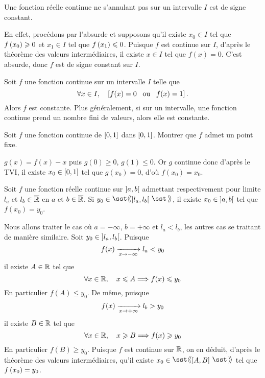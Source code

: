 \documentclass{magnolia}
\begin{document}
\begin{remarques}
\remarque Une fonction réelle continue ne s'annulant pas sur un intervalle $I$ est
  de signe constant.
  \begin{sol}
  En effet, procédons par l'absurde et supposons qu'il existe
  $x_0\in I$ tel que $f\left(x_0\right)\geqslant 0$ et $x_1\in I$ tel que $f\left(x_1\right)\leqslant 0$.
  Puisque $f$ est continue sur $I$, d'après le théorème des valeurs intermédiaires,
  il existe $x\in I$ tel que $f(x)=0$. C'est absurde, donc $f$ est de signe
  constant sur $I$.    
  \end{sol}
\remarque Soit $f$ une fonction continue sur un intervalle $I$ telle que
  \[\forall x\in I ,\quad \left[f(x)=0 \quad\!\text{ou}\quad\! f(x)=1\right].\]
  Alors $f$ est constante. Plus généralement, si sur un intervalle, une fonction
  continue prend un nombre fini de valeurs, alors elle est constante.
\end{remarques}

\begin{exoUnique}
\exo Soit $f$ une fonction continue de $\left[0,1\right]$ dans $\left[0,1\right]$.
  Montrer que $f$ admet un point fixe.
\begin{sol}
$g(x)=f(x)-x$ puis $g(0)\geq 0$, $g(1)\leq 0$. Or $g$ continue donc d'après le TVI, il existe $x_0\in \left[0,1\right]$ tel que $g(x_0)=0$, d'où $f(x_0)=x_0$.
\end{sol}
\end{exoUnique}

\begin{proposition}[utile=-3]
Soit $f$ une fonction réelle continue sur $\left]a,b\right[$ admettant
  respectivement pour limite $l_a$ et $l_b\in\overline{\mathbb{R}}$ en $a$ et $b\in\overline{\mathbb{R}}$. 
  Si $y_0\in\intergo{l_a}{l_b}$, il existe $x_0\in\left]a,b\right[$ tel que
  $f(x_0)=y_0$.
\end{proposition}

\begin{preuve}
Nous allons traiter le cas où $a=-\infty$, $b=+\infty$ et $l_a<l_b$, les autres
cas se traitant de manière similaire. Soit $y_0\in\left]l_a,l_b\right[$. Puisque
\[f(x)\xrightarrow[x\rightarrow -\infty]{} l_a<y_0\]
il existe $A\in\mathbb{R}$ tel que
\[\forall x\in\mathbb{R} ,\quad x\leqslant A \Longrightarrow f(x)\leqslant y_0\]
En particulier $f(A)\leq y_0$. De même, puisque
\[f(x)\xrightarrow[x\rightarrow +\infty]{} l_b>y_0\]
il existe $B\in\mathbb{R}$ tel que
\[\forall x\in\mathbb{R} ,\quad x\geqslant B \Longrightarrow f(x)\geqslant y_0\]
En particulier $f(B)\geq y_0$. Puisque $f$ est continue sur $\mathbb{R}$, on en
déduit, d'après le théorème des valeurs intermédiaires, qu'il existe
$x_0\in\intergf{A}{B}$ tel que $f\left(x_0\right)=y_0$.
\end{preuve}
\end{document}
